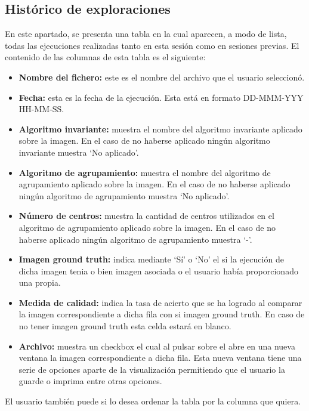 \subsection{Histórico de exploraciones}\label{histórico-de-exploraciones}

En este apartado, se presenta una tabla en la cual aparecen, a modo de lista, todas las ejecuciones realizadas tanto en esta sesión como en sesiones previas. El contenido de las columnas de esta tabla es el siguiente:

\begin{itemize}
    \item \textbf{Nombre del fichero:} este es el nombre del archivo que el usuario seleccionó.
    \item \textbf{Fecha:} esta es la fecha de la ejecución. Esta está en formato DD-MMM-YYY HH-MM-SS.
    \item \textbf{Algoritmo invariante:} muestra el nombre del algoritmo invariante aplicado sobre la imagen. En el caso de no haberse aplicado ningún algoritmo invariante muestra `No aplicado'.
    \item \textbf{Algoritmo de agrupamiento:} muestra el nombre del algoritmo de agrupamiento aplicado sobre la imagen. En el caso de no haberse aplicado ningún algoritmo de agrupamiento muestra `No aplicado'.
    \item \textbf{Número de centros:} muestra la cantidad de centros utilizados en el algoritmo de agrupamiento aplicado sobre la imagen. En el caso de no haberse aplicado ningún algoritmo de agrupamiento muestra `-'.
    \item \textbf{Imagen ground truth:} indica mediante `Sí' o `No' el si la ejecución de dicha imagen tenia o bien imagen asociada o el usuario había proporcionado una propia.
    \item \textbf{Medida de calidad:} indica la tasa de acierto que se ha logrado al comparar la imagen correspondiente a dicha fila con si imagen ground truth. En caso de no tener imagen ground truth esta celda estará en blanco.
    \item \textbf{Archivo:} muestra un checkbox el cual al pulsar sobre el abre en una nueva ventana la imagen correspondiente a dicha fila. Esta nueva ventana tiene una serie de opciones aparte de la visualización permitiendo que el usuario la guarde o imprima entre otras opciones.
\end{itemize}

El usuario también puede si lo desea ordenar la tabla por la columna que quiera.


